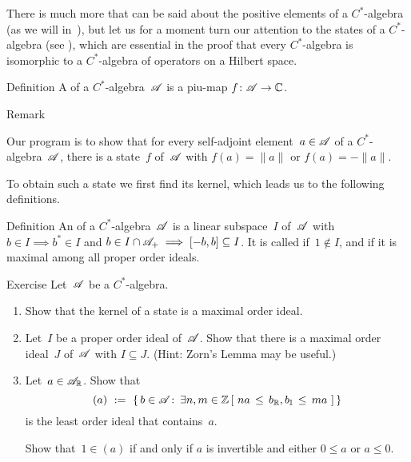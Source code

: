 \documentclass[main]{subfiles}
\begin{document}
\begin{parsec}%
\begin{point}%
There is much more that can be said
about the positive elements of a $C^*$-algebra
(as we will in~),
but let us for a moment
turn our attention to the states of a $C^*$-algebra
(see ),
which are
essential
in the proof that every $C^*$-algebra
is isomorphic to a $C^*$-algebra of operators on a Hilbert space.
\end{point}
\begin{point}[state]{Definition}%
A  of a $C^*$-algebra~$\mathscr{A}$
is a piu-map $f\colon \mathscr{A}\to \mathbb{C}$.
\begin{point}{Remark}%
\end{point}
\end{point}
\begin{point}
Our program is to show that 
for every self-adjoint element~$a\in \mathscr{A}$
of a $C^*$-algebra~$\mathscr{A}$,
there is a state~$f$ of~$\mathscr{A}$ with $f(a)=\|a\|$ or $f(a)=-\|a\|$.

To obtain such a state
we first find its kernel,
which leads us to the following definitions.
\end{point}
\begin{point}{Definition}%
An 
of a $C^*$-algebra~$\mathscr{A}$
is a linear subspace~$I$ of~$\mathscr{A}$
with $b\in I\implies b^*\in I$
and $b\in I\cap\mathscr{A}_{+}\implies [-b,b]\subseteq I$.
It is called  if~$1\notin I$,
and  if it is maximal among all proper order ideals.
\end{point}
\begin{point}{Exercise}%
Let~$\mathscr{A}$ be a $C^*$-algebra.
\begin{enumerate}
\item
Show that the kernel of a state is a maximal order ideal.
\item
Let~$I$ be a proper order ideal of~$\mathscr{A}$.
Show that there is a maximal 
order ideal~$J$ of~$\mathscr{A}$ with $I\subseteq J$.
(Hint: Zorn's Lemma may be useful.)
\item
Let~$a\in \mathscr{A}_{\mathbb{R}}$.
Show that 
\begin{equation*}
(a)\ := \ \{\, b\in \mathscr{A}\colon\, \exists n,m\in \mathbb{Z}\,
[\ na \,\leq\, b_{\mathbb{R}},b_{\mathbb{I}}\,\leq\, ma\ ]\,\}
\end{equation*}
is the least order ideal that contains~$a$.

Show that~$1\in (a)$ if and only if $a$ is invertible
and either $0\leq a$ or $a\leq 0$.


\end{enumerate}
\end{point}
\end{parsec}
\end{document}
